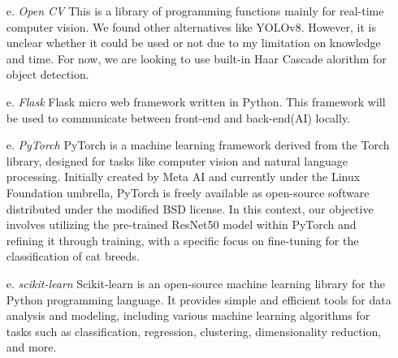 \documentclass[conference]{IEEEtran}
\begin{document}
\begin{itemize}
\item[e.]{\emph{Open CV}}
   \newline
   This is a library of programming functions mainly for real-time computer vision. We found other alternatives like YOLOv8. However, it is unclear whether it could be used or not due to my limitation on knowledge and time. For now, we are looking to use built-in Haar Cascade alorithm for object detection.
    \\ \end{itemize}
\begin{itemize}
\item[e.]{\emph{Flask}}
   \newline
   Flask micro web framework written in Python. This framework will be used to communicate between front-end and back-end(AI) locally.
    \\ \end{itemize}
\begin{itemize}
\item[e.]{\emph{PyTorch}}
   \newline
    PyTorch is a machine learning framework derived from the Torch library, designed for tasks like computer vision and natural language processing. Initially created by Meta AI and currently under the Linux Foundation umbrella, PyTorch is freely available as open-source software distributed under the modified BSD license. In this context, our objective involves utilizing the pre-trained ResNet50 model within PyTorch and refining it through training, with a specific focus on fine-tuning for the classification of cat breeds.
    \\ \end{itemize}
\begin{itemize}
\item[e.]{\emph{scikit-learn}}
   \newline
   Scikit-learn is an open-source machine learning library for the Python programming language. It provides simple and efficient tools for data analysis and modeling, including various machine learning algorithms for tasks such as classification, regression, clustering, dimensionality reduction, and more.
    \\ \end{itemize}

\newpage
\end{document}
